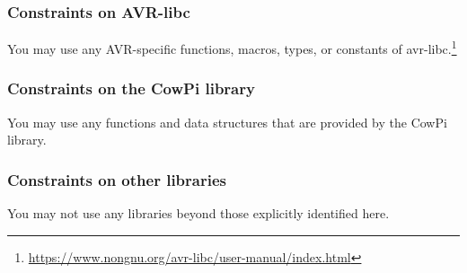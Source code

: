 \subsubsection{Constraints on AVR-libc}

You may use any AVR-specific functions, macros, types, or constants of avr-libc.\footnote{
    \url{https://www.nongnu.org/avr-libc/user-manual/index.html}
}

\subsubsection{Constraints on the CowPi library}

You may use any functions and data structures that are provided by the CowPi library.

\subsubsection{Constraints on other libraries}

You may not use any libraries beyond those explicitly identified here.